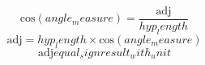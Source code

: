 \[\text{{cos}}({angle_measure})=\frac{{\text{{{adj}}}}}{{{hyp_length}}}\]
\[\text{{{adj}}}={hyp_length}\times \text{{cos}}({angle_measure})\]
\[\text{{{adj}}}{equal_sign}{result_with_unit}\]
